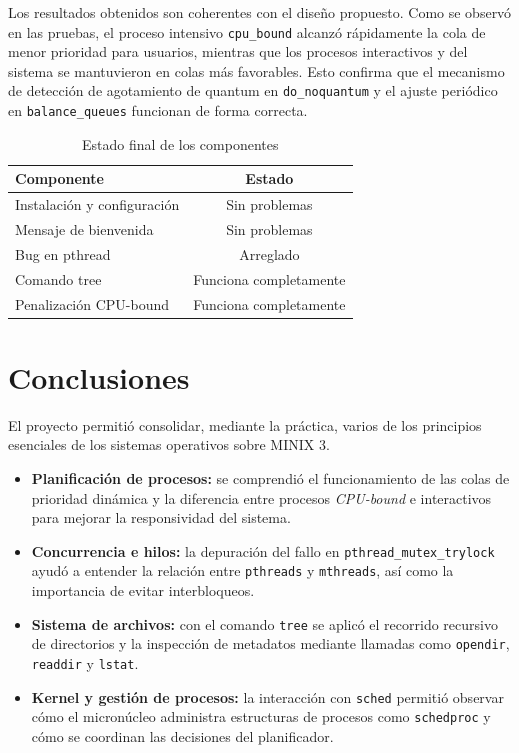 \documentclass[12pt,spanish]{article}
\begin{document}
Los resultados obtenidos son coherentes con el diseño propuesto. Como se observó en las pruebas, el proceso intensivo \texttt{cpu\_bound} alcanzó rápidamente la cola de menor prioridad para usuarios, mientras que los procesos interactivos y del sistema se mantuvieron en colas más favorables. Esto confirma que el mecanismo de detección de agotamiento de quantum en \texttt{do\_noquantum} y el ajuste periódico en \texttt{balance\_queues} funcionan de forma correcta.

\begin{table}[H]
\centering
\caption{Estado final de los componentes}
\begin{tabular}{|l|c|}
\hline
\textbf{Componente} & \textbf{Estado} \\
\hline
Instalación y configuración & Sin problemas \\
Mensaje de bienvenida & Sin problemas \\
Bug en pthread & Arreglado \\
Comando tree & Funciona completamente \\
Penalización CPU-bound & Funciona completamente \\
\hline
\end{tabular}
\end{table}

\section{Conclusiones}

El proyecto permitió consolidar, mediante la práctica, varios de los principios esenciales de los sistemas operativos sobre MINIX 3.

\begin{itemize}
    \item \textbf{Planificación de procesos:} se comprendió el funcionamiento de las colas de prioridad dinámica y la diferencia entre procesos \textit{CPU-bound} e interactivos para mejorar la responsividad del sistema.
    \item \textbf{Concurrencia e hilos:} la depuración del fallo en \texttt{pthread\_mutex\_trylock} ayudó a entender la relación entre \texttt{pthreads} y \texttt{mthreads}, así como la importancia de evitar interbloqueos.
    \item \textbf{Sistema de archivos:} con el comando \texttt{tree} se aplicó el recorrido recursivo de directorios y la inspección de metadatos mediante llamadas como \texttt{opendir}, \texttt{readdir} y \texttt{lstat}.
    \item \textbf{Kernel y gestión de procesos:} la interacción con \texttt{sched} permitió observar cómo el micronúcleo administra estructuras de procesos como \texttt{schedproc} y cómo se coordinan las decisiones del planificador.
\end{itemize}
\end{document}
